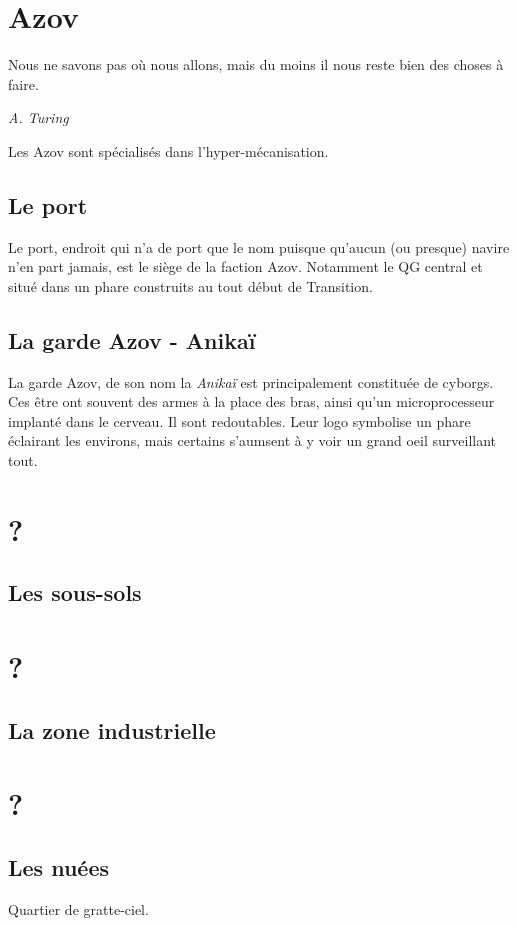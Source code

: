 \documentclass{book}
\begin{document}
\section{Azov}
\epigraph{Nous ne savons pas où nous allons, mais du moins il nous reste bien des choses à faire.}{\textit{A. Turing}}
Les Azov sont spécialisés dans l'hyper-mécanisation. 

\subsection{Le port}
Le port, endroit qui n'a de port que le nom puisque qu'aucun (ou presque) navire n'en part jamais, est le siège de la faction Azov. Notamment le QG central et situé dans un phare construits au tout début de Transition.

\subsection{La garde Azov - Anikaï}
La garde Azov, de son nom la \emph{Anikaï} est principalement constituée de cyborgs. Ces être ont souvent des armes à la place des bras, ainsi qu'un microprocesseur implanté dans le cerveau. Il sont redoutables. Leur logo symbolise un phare éclairant les environs, mais certains s'aumsent à y voir un grand oeil surveillant tout.
\begin{figure}[H]
    \centering
    \def\svgwidth{10em}
    
\end{figure}

\section{?}
\subsection{Les sous-sols}

\section{?}
\subsection{La zone industrielle}

\section{?}
\subsection{Les nuées}
Quartier de gratte-ciel.
\end{document}
